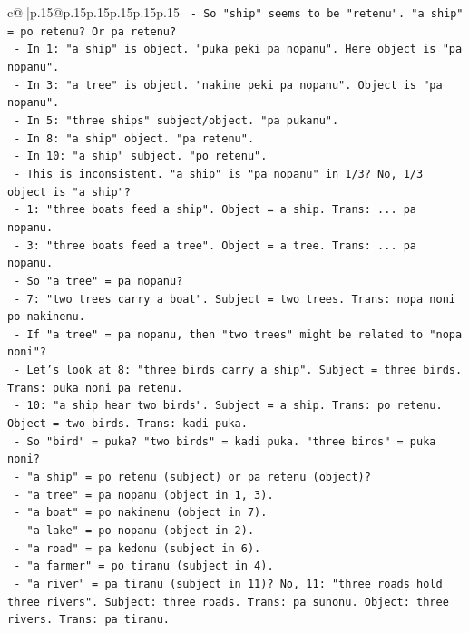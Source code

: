 \documentclass{article}
\begin{document}
{\begin{supertabular}{c@{$\;$}|p{.15\linewidth}@{}p{.15\linewidth}p{.15\linewidth}p{.15\linewidth}p{.15\linewidth}p{.15\linewidth}}
{{{\texttt{  {-} So "ship" seems to be "retenu". "a ship" = po retenu? Or pa retenu?} \\
\texttt{  {-} In 1: "a ship" is object. "puka peki pa nopanu". Here object is "pa nopanu".} \\
\texttt{  {-} In 3: "a tree" is object. "nakine peki pa nopanu". Object is "pa nopanu".} \\
\texttt{  {-} In 5: "three ships" subject/object. "pa pukanu".} \\
\texttt{  {-} In 8: "a ship" object. "pa retenu".} \\
\texttt{  {-} In 10: "a ship" subject. "po retenu".} \\
\texttt{  {-} This is inconsistent. "a ship" is "pa nopanu" in 1/3? No, 1/3 object is "a ship"?} \\
\texttt{  {-} 1: "three boats feed a ship". Object = a ship. Trans: ... pa nopanu.} \\
\texttt{  {-} 3: "three boats feed a tree". Object = a tree. Trans: ... pa nopanu.} \\
\texttt{  {-} So "a tree" = pa nopanu?} \\
\texttt{  {-} 7: "two trees carry a boat". Subject = two trees. Trans: nopa noni po nakinenu.} \\
\texttt{  {-} If "a tree" = pa nopanu, then "two trees" might be related to "nopa noni"?} \\
\texttt{  {-} Let's look at 8: "three birds carry a ship". Subject = three birds. Trans: puka noni pa retenu.} \\
\texttt{  {-} 10: "a ship hear two birds". Subject = a ship. Trans: po retenu. Object = two birds. Trans: kadi puka.} \\
\texttt{  {-} So "bird" = puka? "two birds" = kadi puka. "three birds" = puka noni?} \\
\texttt{  {-} "a ship" = po retenu (subject) or pa retenu (object)?} \\
\texttt{  {-} "a tree" = pa nopanu (object in 1, 3).} \\
\texttt{  {-} "a boat" = po nakinenu (object in 7).} \\
\texttt{  {-} "a lake" = po nopanu (object in 2).} \\
\texttt{  {-} "a road" = pa kedonu (subject in 6).} \\
\texttt{  {-} "a farmer" = po tiranu (subject in 4).} \\
\texttt{  {-} "a river" = pa tiranu (subject in 11)? No, 11: "three roads hold three rivers". Subject: three roads. Trans: pa sunonu. Object: three rivers. Trans: pa tiranu.} \\
}}}
\end{supertabular}}
\end{document}
